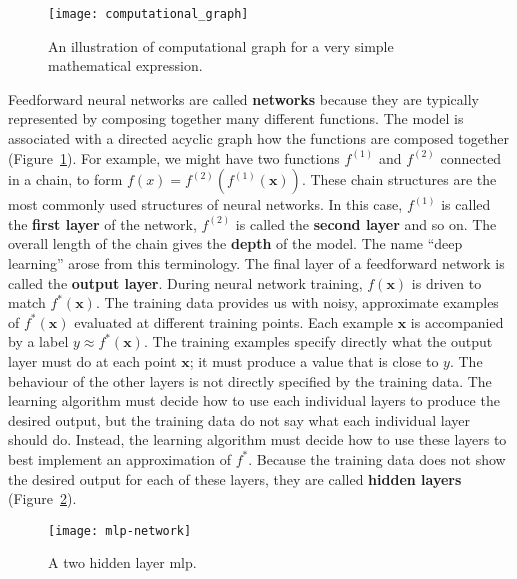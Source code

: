\begin{figure}[h]
    \centering
    \texttt{[image: computational\_graph]}
    \caption{An illustration of computational graph for a very simple
    mathematical expression.}
    \label{fig:computational_graph}
\end{figure}
Feedforward neural networks are called \textbf{networks} because they are
typically represented by composing together many different functions. The model
is associated with a directed acyclic graph how the functions are composed
together (Figure~\ref{fig:computational_graph}). For example, we might have two
functions $f^{(1)}$ and $f^{(2)}$ connected in a chain, to form
$f(x) = f^{(2)}(f^{(1)}(\boldsymbol{x}))$. These chain structures are the most
commonly used structures of neural networks. In this case, $f^{(1)}$ is called
the \textbf{first layer} of the network, $f^{(2)}$ is called the \textbf{second
layer} and so on. The overall length of the chain gives the \textbf{depth} of
the model. The name ``deep learning'' arose from this terminology. The final
layer of a feedforward network is called the \textbf{output layer}. During
neural network training, $f(\boldsymbol{x})$ is driven to match
$f^*(\boldsymbol{x})$. The training data provides us with noisy, approximate
examples of $f^*(\boldsymbol{x})$ evaluated at different training points. Each
example $\boldsymbol{x}$ is accompanied by a label $y \approx
f^*(\boldsymbol{x})$. The training examples specify directly what the output
layer must do at each point $\boldsymbol{x}$; it must produce a value that is
close to $y$. The behaviour of the other layers is not directly specified by
the training data. The learning algorithm must decide how to use each
individual layers to produce the desired output, but the training data do not
say what each individual layer should do. Instead, the learning algorithm must
decide how to use these layers to best implement an approximation of $f^*$.
Because the training data does not show the desired output for each of these
layers, they are called \textbf{hidden layers} (Figure~\ref{fig:mlp-network}).
\begin{figure}[h]
    \centering
    \texttt{[image: mlp-network]}
    \caption{A two hidden layer \acrshort{mlp}.}
    \label{fig:mlp-network}
\end{figure}


